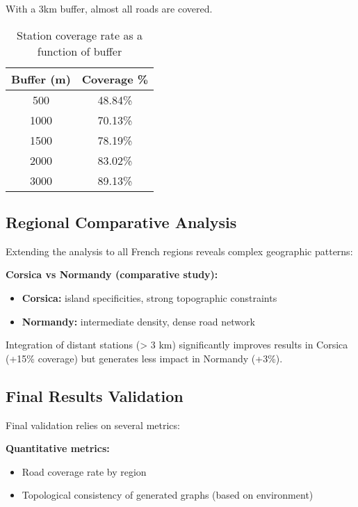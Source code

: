 \documentclass[12pt,a4paper]{report}
\begin{document}
With a 3km buffer, almost all roads are covered.

\begin{table}[h]
    \centering
    \begin{tabular}{c c}
        \hline
        \textbf{Buffer (m)} & \textbf{Coverage \%} \\
        \hline
        500  & 48.84\% \\
        1000 & 70.13\% \\
        1500 & 78.19\% \\
        2000 & 83.02\% \\
        3000 & 89.13\% \\
        \hline
    \end{tabular}
    \caption{Station coverage rate as a function of buffer}
    \label{tab:buffer_couverture}
\end{table}

\subsection{Regional Comparative Analysis}

Extending the analysis to all French regions reveals complex geographic patterns:

\textbf{Corsica vs Normandy (comparative study):}
\begin{itemize}
    \item \textbf{Corsica:} island specificities, strong topographic constraints
    \item \textbf{Normandy:} intermediate density, dense road network
\end{itemize}

Integration of distant stations (> 3 km) significantly improves results in Corsica (+15\% coverage) but generates less impact in Normandy (+3\%).

\subsection{Final Results Validation}

Final validation relies on several metrics:

\textbf{Quantitative metrics:}
\begin{itemize}
    \item Road coverage rate by region
    \item Topological consistency of generated graphs (based on environment)
\end{itemize}
\end{document}
